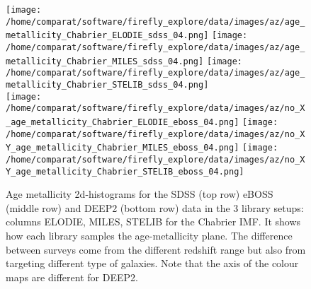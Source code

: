 \documentclass[onecolumn]{aa}
\begin{document}
\begin{figure}
\begin{center}
\caption{\label{fig:distributions:AZ} 
Age metallicity 2d-histograms for the SDSS (top row) eBOSS (middle row) and DEEP2 (bottom row) data in the 3 library setups: columns ELODIE, MILES, STELIB for the Chabrier IMF. 
It shows how each library samples the age-metallicity plane. 
The difference between surveys come from the different redshift range but also from targeting different type of galaxies.
Note that the axis of the colour maps are different for DEEP2.}
\texttt{[image: /home/comparat/software/firefly\_explore/data/images/az/age\_metallicity\_Chabrier\_ELODIE\_sdss\_04.png]}
\hspace*{-1.7cm}
\texttt{[image: /home/comparat/software/firefly\_explore/data/images/az/age\_metallicity\_Chabrier\_MILES\_sdss\_04.png]}
\hspace*{-1.7cm}
\texttt{[image: /home/comparat/software/firefly\_explore/data/images/az/age\_metallicity\_Chabrier\_STELIB\_sdss\_04.png]} \\
\vspace*{-1.1cm}
\texttt{[image: /home/comparat/software/firefly\_explore/data/images/az/no\_X\_age\_metallicity\_Chabrier\_ELODIE\_eboss\_04.png]}
\hspace*{-1.7cm}
\texttt{[image: /home/comparat/software/firefly\_explore/data/images/az/no\_XY\_age\_metallicity\_Chabrier\_MILES\_eboss\_04.png]}
\hspace*{-1.7cm}
\texttt{[image: /home/comparat/software/firefly\_explore/data/images/az/no\_XY\_age\_metallicity\_Chabrier\_STELIB\_eboss\_04.png]}\\
\vspace*{-1.1cm}


\end{center}
\end{figure}
\end{document}
